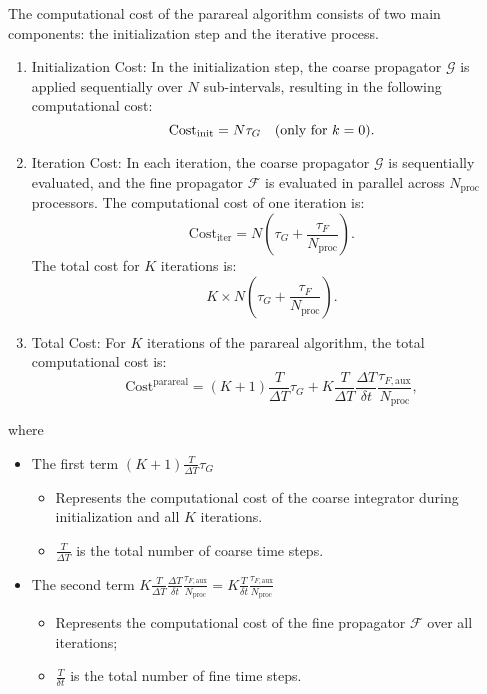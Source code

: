 \documentclass[preprint,12pt]{elsarticle}
\begin{document}
	The computational cost of the parareal algorithm consists of two main components: the initialization step and the iterative process. 
	\begin{enumerate}
		\item Initialization Cost: In the initialization step, the coarse propagator $\mathcal{G}$ is applied sequentially over $N$ sub-intervals, resulting in the following computational cost:
		\[
		\text{Cost}_{\text{init}}= N \tau_G \quad \text{(only for \( k = 0 \))}.
		\]
		\item Iteration Cost: In each iteration, the coarse propagator $\mathcal{G}$ is sequentially evaluated, and the fine propagator $\mathcal{F}$ is evaluated in parallel across  $N_{\text{proc}}$ processors. The computational cost of one iteration is:
		\[
		\text{Cost}_{\text{iter}}=  N \left( \tau_G + \frac{\tau_F}{N_{\text{proc}}} \right).
		\]
		The total cost for \( K \) iterations is:
		\[
		K \times N \left( \tau_G + \frac{\tau_F}{N_{\text{proc}}} \right).
		\]
		\item Total Cost: For $K$ iterations of the parareal algorithm, the total computational cost is:
		\[
		\text{Cost}^{\text{parareal}} = (K+1) \frac{T}{\Delta T} \tau_G + K \frac{T}{\Delta T}\frac{\Delta T}{\delta t} \frac{\tau_ {F,\text{aux}}}{N_{\text{proc}}},
		\]
	\end{enumerate}
	where
	\begin{itemize}
		\item The first term $(K+1) \frac{T}{\Delta T} \tau_G$
		\begin{itemize}
			\item Represents the computational cost of the coarse integrator during initialization and all $K$ iterations.
			\item $\frac{T}{\Delta T}$ is the total number of coarse time steps.
		\end{itemize}
		
		\item The second term $K \frac{T}{\Delta T}\frac{\Delta T}{\delta t} \frac{\tau_ {F,\text{aux}}}{N_{\text{proc}}}= K \frac{T}{\delta t} \frac{\tau_{F,\text{aux}}}{N_{\text{proc}}}$
		\begin{itemize}
			\item Represents the computational cost of the fine propagator $\mathcal{F}$ over all iterations;
			\item $\frac{T}{\delta t}$ is the total number of fine time steps.
		\end{itemize}
	\end{itemize}
	
\end{document}
